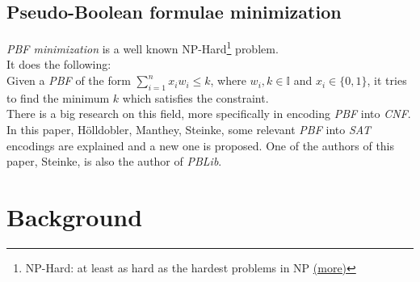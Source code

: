 

\subsection{Pseudo-Boolean formulae minimization}
\emph{PBF minimization} is a well known NP-Hard\footnote{NP-Hard: at least as hard as the hardest problems in NP \href{https://en.wikipedia.org/wiki/NP-hardness}{(more)}} problem. \\
It does the following:\\
Given a \emph{PBF} of the form $\sum_{i=1}^{n} x_{i}w_{i} \leq k$, where $w_{i},k \in \mathbb{I}$ and $x_{i} \in \{0,1\}$, it tries to find the minimum $k$ which satisfies the constraint.\\

There is a big research on this field, more specifically in encoding \emph{PBF} into \emph{CNF}. In this paper, Hölldobler, Manthey, Steinke\cite{Holldobler}, some relevant \emph{PBF} into \emph{SAT} encodings are explained and a new one is proposed. One of the authors of this paper, Steinke, is also the author of \emph{PBLib}.  

\section{Background}

